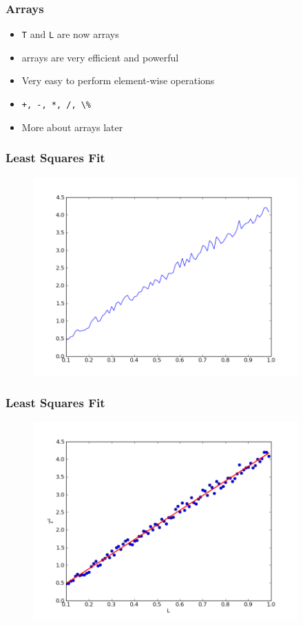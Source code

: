 \documentclass[14pt,compress]{beamer}
\newcommand{\typ}[1]{\lstinline{#1}}
\begin{document}
\begin{frame}[fragile]
\frametitle{Arrays}
\begin{itemize}
\item \typ{T} and \typ{L} are now arrays
\item arrays are very efficient and powerful 
\item Very easy to perform element-wise operations
\item \typ{+, -, *, /, \%}
\item More about arrays later
\end{itemize}
\end{frame}

\begin{frame}[fragile]
\frametitle{Least Squares Fit}
\vspace{-0.15in}
\begin{figure}
\includegraphics[width=4in]{data/L-Tsq-Line.png}
\end{figure}
\end{frame}

\begin{frame}[fragile]
\frametitle{Least Squares Fit}
\vspace{-0.15in}
\begin{figure}
\includegraphics[width=4in]{data/least-sq-fit.png}
\end{figure}
\end{frame}
\end{document}
